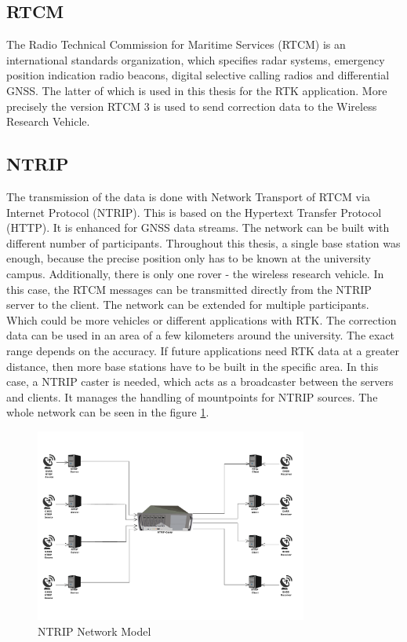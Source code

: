 \subsection{RTCM}

The Radio Technical Commission for Maritime Services (RTCM) is an international standards organization, which specifies radar systems, emergency position indication radio beacons, digital selective calling radios and differential GNSS. The latter of which is used in this thesis for the RTK application. More precisely the version RTCM 3 is used to send correction data to the Wireless Research Vehicle. \cite{RTCM}

\subsection{NTRIP}

The transmission of the data is done with Network Transport of RTCM via Internet Protocol (NTRIP). This is based on the Hypertext Transfer Protocol (HTTP). It is enhanced for GNSS data streams. The network can be built with different number of participants. Throughout this thesis, a single base station was enough, because the precise position only has to be known at the university campus. Additionally, there is only one rover - the wireless research vehicle. In this case, the RTCM messages can be transmitted directly from the NTRIP server to the client. The network can be extended for multiple participants. Which could be more vehicles or different applications with RTK. The correction data can be used in an area of a few kilometers around the university. The exact range depends on the accuracy. If future applications need RTK data at a greater distance, then more base stations have to be built in the specific area. In this case, a NTRIP caster is needed, which acts as a broadcaster between the servers and clients. It manages the handling of mountpoints for NTRIP sources. The whole network can be seen in the figure \ref{fig:NTRIP_model}. \cite{NTRIPApplication&Benefit} \cite{NTRIPV1}

\begin{figure}[htb]
	\centering
	\includegraphics[width=0.8\textwidth]{images/NTRIP_model}
	\caption{NTRIP Network Model}
	\label{fig:NTRIP_model}
\end{figure}

